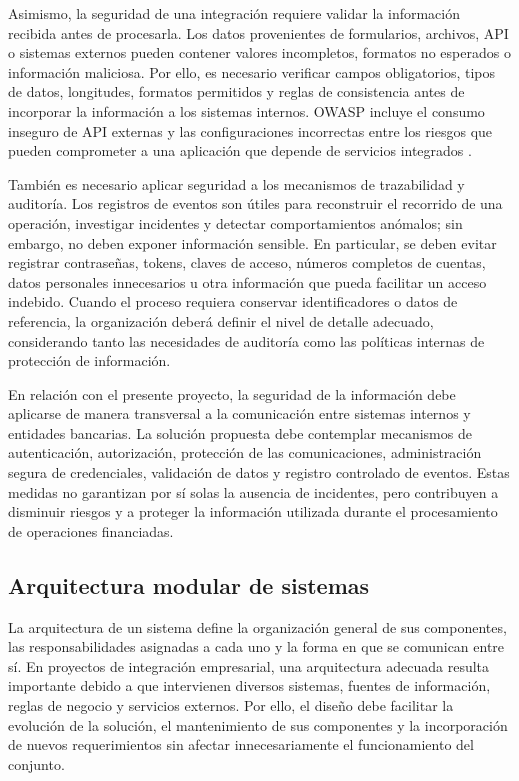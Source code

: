 Asimismo, la seguridad de una integración requiere validar la información recibida antes de procesarla. Los datos provenientes de formularios, archivos, API o sistemas externos pueden contener valores incompletos, formatos no esperados o información maliciosa. Por ello, es necesario verificar campos obligatorios, tipos de datos, longitudes, formatos permitidos y reglas de consistencia antes de incorporar la información a los sistemas internos. OWASP incluye el consumo inseguro de API externas y las configuraciones incorrectas entre los riesgos que pueden comprometer a una aplicación que depende de servicios integrados \citep{owasp2023}.

También es necesario aplicar seguridad a los mecanismos de trazabilidad y auditoría. Los registros de eventos son útiles para reconstruir el recorrido de una operación, investigar incidentes y detectar comportamientos anómalos; sin embargo, no deben exponer información sensible. En particular, se deben evitar registrar contraseñas, tokens, claves de acceso, números completos de cuentas, datos personales innecesarios u otra información que pueda facilitar un acceso indebido. Cuando el proceso requiera conservar identificadores o datos de referencia, la organización deberá definir el nivel de detalle adecuado, considerando tanto las necesidades de auditoría como las políticas internas de protección de información.

En relación con el presente proyecto, la seguridad de la información debe aplicarse de manera transversal a la comunicación entre sistemas internos y entidades bancarias. La solución propuesta debe contemplar mecanismos de autenticación, autorización, protección de las comunicaciones, administración segura de credenciales, validación de datos y registro controlado de eventos. Estas medidas no garantizan por sí solas la ausencia de incidentes, pero contribuyen a disminuir riesgos y a proteger la información utilizada durante el procesamiento de operaciones financiadas.

\subsection{Arquitectura modular de sistemas}

La arquitectura de un sistema define la organización general de sus componentes, las responsabilidades asignadas a cada uno y la forma en que se comunican entre sí. En proyectos de integración empresarial, una arquitectura adecuada resulta importante debido a que intervienen diversos sistemas, fuentes de información, reglas de negocio y servicios externos. Por ello, el diseño debe facilitar la evolución de la solución, el mantenimiento de sus componentes y la incorporación de nuevos requerimientos sin afectar innecesariamente el funcionamiento del conjunto.

